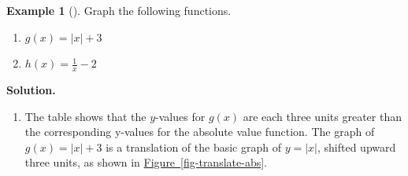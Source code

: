 \documentclass[10pt,]{book}
\theoremstyle{plain}
\theoremstyle{definition}
\theoremstyle{definition}
\newtheorem{example}[theorem]{Example}
\numberwithin{equation}{section}
\newcommand{\hrulethin}  {\noalign{\hrule height 0.04em}}
\newcommand{\hrulethick} {\noalign{\hrule height 0.11em}}
\newcounter{figstack}
\newlength\fight
\newcommand\pushValignCaptionBottom[5][b]{%
\stepcounter{figstack}%
\expandafter\def\csname %
figalign\romannumeral\value{figstack}\endcsname{#1}%
\expandafter\def\csname %
figtype\romannumeral\value{figstack}\endcsname{#2}%
\expandafter\def\csname %
figwd\romannumeral\value{figstack}\endcsname{#3}%
\expandafter\def\csname %
figcontent\romannumeral\value{figstack}\endcsname{#4}%
\expandafter\def\csname %
figcap\romannumeral\value{figstack}\endcsname{#5}%
\setbox0=\hbox{%
\begin{#2}{#3}#4\end{#2}}%
\ifdim\dimexpr\ht0+\dp0\relax>\fight\global\setlength{\fight}{%
\dimexpr\ht0+\dp0\relax}\fi%
}
\newcommand\abs[1]{\left|#1\right|}
\begin{document}
%
\begin{example}[]\label{example-translations}
Graph the following functions.
        \leavevmode%
\begin{enumerate}[label=*\alph**]
\item\hypertarget{li-288}{}\(g(x) = \abs{x} + 3\)\item\hypertarget{li-289}{}\(h(x) = \frac{1}{x}− 2\)\end{enumerate}

\par\medskip\noindent%
\textbf{Solution.}\quad \leavevmode%
\begin{enumerate}[label=*\alph**]
\item\hypertarget{li-290}{}The table shows that the \(y\)-values for \(g(x)\) are each three units greater than the corresponding y-values for the absolute value function. The graph of \(g(x) = \abs{x} + 3\) is a translation of the basic graph of \(y = \abs{x}\), shifted upward three units, as shown in \hyperref[fig-translate-abs]{Figure~\ref{fig-translate-abs}}.
        \leavevmode%
\end{enumerate}
\end{example}
\end{document}
